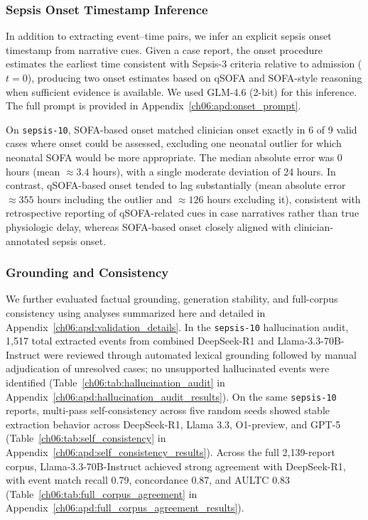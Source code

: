

\subsubsection{Sepsis Onset Timestamp Inference}
\label{ch06:sec:onset-inference}
In addition to extracting event--time pairs, we infer an explicit sepsis onset timestamp from narrative cues.
Given a case report, the onset procedure estimates the earliest time consistent with Sepsis-3 criteria relative to admission ($t=0$), producing two onset estimates based on qSOFA and SOFA-style reasoning when sufficient evidence is available.
We used GLM-4.6 (2-bit) for this inference.
The full prompt is provided in Appendix~\ref{ch06:apd:onset_prompt}.

\label{ch06:sec:onset_results}

On \texttt{sepsis-10}, SOFA-based onset matched clinician onset exactly in 6 of 9 valid cases where onset could be assessed, excluding one neonatal outlier for which neonatal SOFA would be more appropriate.
The median absolute error was 0 hours (mean $\approx 3.4$ hours), with a single moderate deviation of 24 hours.
In contrast, qSOFA-based onset tended to lag substantially (mean absolute error $\approx 355$ hours including the outlier and $\approx 126$ hours excluding it), consistent with retrospective reporting of qSOFA-related cues in case narratives rather than true physiologic delay, whereas SOFA-based onset closely aligned with clinician-annotated sepsis onset.

\subsubsection{Grounding and Consistency}
\label{ch06:sec:additional_validation_summary}

We further evaluated factual grounding, generation stability, and full-corpus consistency using analyses summarized here and detailed in Appendix~\ref{ch06:apd:validation_details}.
In the \texttt{sepsis-10} hallucination audit, 1,517 total extracted events from combined DeepSeek-R1 and Llama-3.3-70B-Instruct were reviewed through automated lexical grounding followed by manual adjudication of unresolved cases; no unsupported hallucinated events were identified (Table~\ref{ch06:tab:hallucination_audit} in Appendix~\ref{ch06:apd:hallucination_audit_results}).
On the same \texttt{sepsis-10} reports, multi-pass self-consistency across five random seeds showed stable extraction behavior across DeepSeek-R1, Llama 3.3, O1-preview, and GPT-5 (Table~\ref{ch06:tab:self_consistency} in Appendix~\ref{ch06:apd:self_consistency_results}).
Across the full 2,139-report corpus, Llama-3.3-70B-Instruct achieved strong agreement with DeepSeek-R1, with event match recall 0.79, concordance 0.87, and AULTC 0.83 (Table~\ref{ch06:tab:full_corpus_agreement} in Appendix~\ref{ch06:apd:full_corpus_agreement_results}).

